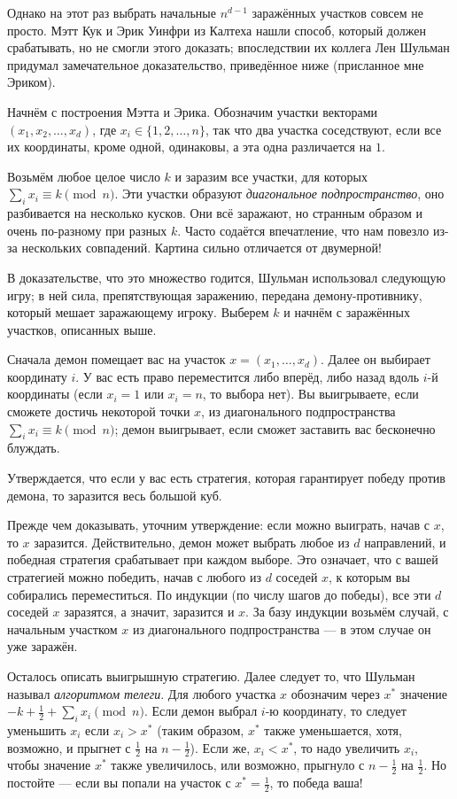 Однако на этот раз выбрать начальные $n^{d-1}$ заражённых участков совсем не просто.
Мэтт Кук и Эрик Уинфри из Калтеха нашли способ, который должен срабатывать, но не смогли этого доказать;
впоследствии их коллега Лен Шульман придумал замечательное доказательство, приведённое ниже (присланное мне Эриком).

Начнём с построения Мэтта и Эрика.
Обозначим участки векторами $(x_1 , x_2 , \dots , x_d )$, где $x_i \in \{1, 2, \dots , n\}$, так что два участка соседствуют, 
если все их координаты, кроме одной, одинаковы, а эта одна различается на $1$.

Возьмём любое целое число $k$ и заразим все участки, для которых $\sum_i x_i \equiv k\pmod n$.
Эти участки образуют \emph{диагональное подпространство}, оно разбивается на несколько кусков.
Они всё заражают, но странным образом и очень по-разному при разных $k$.
Часто содаётся впечатление, что нам повезло из-за нескольких совпадений.
Картина сильно отличается от двумерной!

В доказательстве, что это множество годится, Шульман использовал следующую игру;
в ней сила, препятствующая заражению, передана демону-противнику, который мешает заражающему игроку.
Выберем $k$ и начнём с заражённых участков, описанных выше.

Сначала демон помещает вас на участок $x = (x_1, \dots,x_d )$.
Далее он выбирает координату $i$.
У вас есть право переместится либо вперёд, либо назад вдоль $i$-й координаты (если $x_i=1$ или $x_i=n$, то выбора нет).
Вы выигрываете, если сможете достичь некоторой точки $x$, из диагонального подпространства $\sum_i x_i \equiv k\pmod n$;
демон выигрывает, если сможет заставить вас бесконечно блуждать.

Утверждается, что если у вас есть стратегия, которая гарантирует победу против демона, то заразится весь большой куб.

Прежде чем доказывать, уточним утверждение: если можно выиграть, начав с $x$, то $x$ заразится.
Действительно, демон может выбрать любое из $d$ направлений,
и победная стратегия срабатывает при каждом выборе.
Это означает, что с вашей стратегией можно победить, начав с любого из $d$ соседей $x$, к которым вы собирались переместиться.
По индукции (по числу шагов до победы), все эти $d$ соседей $x$ заразятся, а значит, заразится и $x$.
За базу индукции возьмём случай, с начальным участком $x$ из диагонального подпространства --- в этом случае он уже заражён.

Осталось описать выигрышную стратегию.
Далее следует то, что Шульман называл \emph{алгоритмом телеги}.
Для любого участка $x$ обозначим через $x^*$ значение $-k + \tfrac12 + \sum_i x_i \pmod n$.
Если демон выбрал $i$-ю координату, то следует уменьшить $x_i$ если $x_i > x^*$ (таким образом, $x^*$ также уменьшается, хотя, возможно, и прыгнет с $\tfrac12$ на $n - \tfrac12$).
Если же, $x_i < x^*$, то надо увеличить $x_i$, чтобы значение $x^*$ также увеличилось, или возможно, прыгнуло с $n - \tfrac12$ на $\tfrac12$.
Но постойте --- если вы попали на участок с $x^* = \tfrac12$, то победа ваша!


